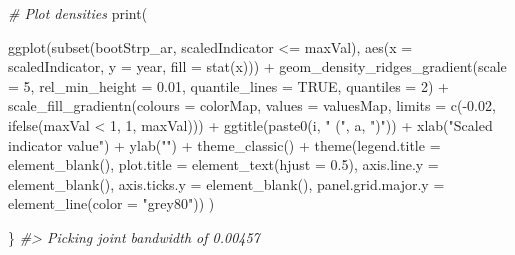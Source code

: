 \documentclass[
]{book}
\newenvironment{Shaded}{\begin{snugshade}}{\end{snugshade}}
\newcommand{\AttributeTok}[1]{\textcolor[rgb]{0.77,0.63,0.00}{#1}}
\newcommand{\CommentTok}[1]{\textcolor[rgb]{0.56,0.35,0.01}{\textit{#1}}}
\newcommand{\ConstantTok}[1]{\textcolor[rgb]{0.00,0.00,0.00}{#1}}
\newcommand{\DecValTok}[1]{\textcolor[rgb]{0.00,0.00,0.81}{#1}}
\newcommand{\FloatTok}[1]{\textcolor[rgb]{0.00,0.00,0.81}{#1}}
\newcommand{\FunctionTok}[1]{\textcolor[rgb]{0.00,0.00,0.00}{#1}}
\newcommand{\NormalTok}[1]{#1}
\newcommand{\SpecialCharTok}[1]{\textcolor[rgb]{0.00,0.00,0.00}{#1}}
\newcommand{\StringTok}[1]{\textcolor[rgb]{0.31,0.60,0.02}{#1}}
\begin{document}
\begin{Shaded}
\begin{Highlighting}[]
  \CommentTok{\# Plot densities}
  \FunctionTok{print}\NormalTok{(}
  
  \FunctionTok{ggplot}\NormalTok{(}\FunctionTok{subset}\NormalTok{(bootStrp\_ar, scaledIndicator }\SpecialCharTok{\textless{}=}\NormalTok{ maxVal), }\FunctionTok{aes}\NormalTok{(}\AttributeTok{x =}\NormalTok{ scaledIndicator, }\AttributeTok{y =}\NormalTok{ year, }\AttributeTok{fill =} \FunctionTok{stat}\NormalTok{(x))) }\SpecialCharTok{+}
    \FunctionTok{geom\_density\_ridges\_gradient}\NormalTok{(}\AttributeTok{scale =} \DecValTok{5}\NormalTok{, }\AttributeTok{rel\_min\_height =} \FloatTok{0.01}\NormalTok{, }\AttributeTok{quantile\_lines =} \ConstantTok{TRUE}\NormalTok{, }\AttributeTok{quantiles =} \DecValTok{2}\NormalTok{) }\SpecialCharTok{+} 
    \FunctionTok{scale\_fill\_gradientn}\NormalTok{(}\AttributeTok{colours =}\NormalTok{ colorMap,}
                         \AttributeTok{values =}\NormalTok{ valuesMap,}
                         \AttributeTok{limits =} \FunctionTok{c}\NormalTok{(}\SpecialCharTok{{-}}\FloatTok{0.02}\NormalTok{, }\FunctionTok{ifelse}\NormalTok{(maxVal }\SpecialCharTok{\textless{}} \DecValTok{1}\NormalTok{, }\DecValTok{1}\NormalTok{, maxVal))) }\SpecialCharTok{+}
    \FunctionTok{ggtitle}\NormalTok{(}\FunctionTok{paste0}\NormalTok{(i, }\StringTok{" ("}\NormalTok{, a, }\StringTok{")"}\NormalTok{)) }\SpecialCharTok{+} 
    \FunctionTok{xlab}\NormalTok{(}\StringTok{"Scaled indicator value"}\NormalTok{) }\SpecialCharTok{+} \FunctionTok{ylab}\NormalTok{(}\StringTok{""}\NormalTok{) }\SpecialCharTok{+} 
    \FunctionTok{theme\_classic}\NormalTok{() }\SpecialCharTok{+} 
    \FunctionTok{theme}\NormalTok{(}\AttributeTok{legend.title =} \FunctionTok{element\_blank}\NormalTok{(), }\AttributeTok{plot.title =} \FunctionTok{element\_text}\NormalTok{(}\AttributeTok{hjust =} \FloatTok{0.5}\NormalTok{),}
          \AttributeTok{axis.line.y =} \FunctionTok{element\_blank}\NormalTok{(), }\AttributeTok{axis.ticks.y =} \FunctionTok{element\_blank}\NormalTok{(),}
          \AttributeTok{panel.grid.major.y =} \FunctionTok{element\_line}\NormalTok{(}\AttributeTok{color =} \StringTok{"grey80"}\NormalTok{))}
\NormalTok{  )}
  
\NormalTok{\}}
\CommentTok{\#\textgreater{} Picking joint bandwidth of 0.00457}
\end{Highlighting}
\end{Shaded}
\end{document}
